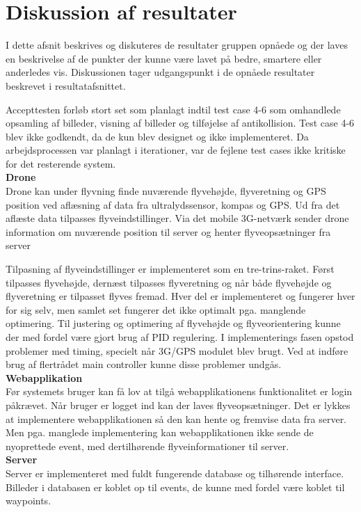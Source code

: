 \section{Diskussion af resultater}

I dette afsnit beskrives og diskuteres de resultater gruppen opnåede og der laves en beskrivelse af de punkter der kunne være lavet på bedre, smartere eller anderledes vis. Diskussionen tager udgangspunkt i de opnåede resultater beskrevet i resultatafsnittet.

Accepttesten forløb stort set som planlagt indtil test case 4-6 som omhandlede opsamling af billeder, visning af billeder og tilføjelse af antikollision. Test case 4-6 blev ikke godkendt, da de kun blev designet og ikke implementeret. Da arbejdsprocessen var planlagt i iterationer, var de fejlene test cases ikke kritiske for det resterende system.\\

\textbf{Drone}\\
Drone kan under flyvning finde nuværende flyvehøjde, flyveretning og GPS position ved aflæsning af data fra ultralydssensor, kompas og GPS.  Ud fra det aflæste data tilpasses flyveindstillinger. Via det mobile 3G-netværk sender drone information om nuværende position til server og henter flyveopsætninger fra server

Tilpasning af flyveindstillinger er implementeret som en tre-trins-raket. Først tilpasses flyvehøjde, dernæst tilpasses flyveretning og når både flyvehøjde og flyveretning er tilpasset flyves fremad. Hver del er implementeret og fungerer hver for sig selv, men samlet set fungerer det ikke optimalt pga. manglende optimering. Til justering og optimering af flyvehøjde og flyveorientering kunne der med fordel være gjort brug af PID regulering.  I implementerings fasen opstod problemer med timing, specielt når 3G/GPS modulet blev brugt. Ved at indføre brug af flertrådet main controller kunne disse problemer undgås. \\

\textbf{Webapplikation}\\
Før systemets bruger kan få lov at tilgå webapplikationens funktionalitet er login påkrævet. Når bruger er logget ind kan der laves flyveopsætninger. Det er lykkes at implementere webapplikationen så den kan hente og fremvise data fra server. 
Men pga. manglede implementering kan webapplikationen ikke sende de nyoprettede event, med dertilhørende flyveinformationer til server.\\


\textbf{Server}\\
Server er implementeret med fuldt fungerende database og tilhørende interface. Billeder i databasen er koblet op til events, de kunne med fordel være koblet til waypoints.
